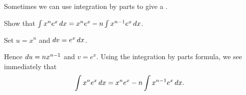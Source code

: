 \documentclass[noauthor]{ximera}
\begin{document}
%
%
%
%
%
%
%
%
%
%
%
%
%
%
%
%

Sometimes we can use integration by parts to give a .

\begin{example}
  Show that $  \int x^n e^x \mathop{}\!d x = x^n e^x -n \int x^{n-1} e^x\mathop{}\!d x$.
  \begin{explanation}
   Set $u= x^n$ and $\mathop{}\!d v = e^x \mathop{}\!d x$.

   Hence $\mathop{}\!d u = n x^{n-1}$ and $v = e^x$. Using the
    integration by parts formula, we see immediately that
    \[
    \int x^n e^x \mathop{}\!d x = x^n e^x -n \int x^{n-1} e^x \mathop{}\!d x.
    \]
  \end{explanation}
\end{example}
\end{document}
